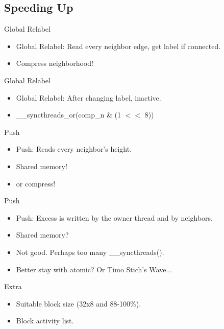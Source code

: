 \documentclass{beamer}
\begin{document}
\subsection{Speeding Up}

\begin{frame}{Global Relabel}
\begin{itemize}
 \item
 Global Relabel: Read \alert{every} neighbor edge, get label if connected.
 \item
 Compress neighborhood!
\end{itemize}
\end{frame}

\begin{frame}{Global Relabel}
\begin{itemize}
 \item
 Global Relabel: After changing label, inactive.
 \item
  \_\_syncthreads\_or(comp\_n \& (1 $<<$ 8))
\end{itemize}
\end{frame}

\begin{frame}{Push}
\begin{itemize}
 \item
 Push: Reads every neighbor's height.
 \item
 Shared memory!
 \item
 or compress!
\end{itemize}
\end{frame}

\begin{frame}{Push}
\begin{itemize}
 \item
 Push: Excess is written by the owner thread and by neighbors.
 \item
 Shared memory?
 \item
 Not good. Perhaps too many \_\_syncthreads().
 \item
 Better stay with atomic? Or Timo Stich's Wave...
\end{itemize}
\end{frame}

\begin{frame}{Extra}
\begin{itemize}
 \item
 Suitable block size (32x8 and 88-100\%).
 \item
 Block activity list.
\end{itemize}
\end{frame}
\end{document}
